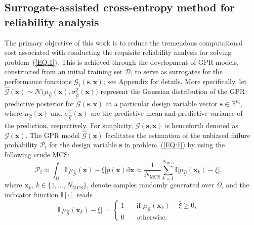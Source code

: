 \documentclass[preprint,3p]{elsarticle}
\begin{document}
\begin{linenumbers}
\subsection{Surrogate-assisted cross-entropy method for reliability analysis}\label{SUBSEC:23}
The primary objective of this work is to reduce the tremendous computational cost associated with conducting the requisite reliability analysis for solving problem~(\ref{EQ:1}).
This is achieved through the development of GPR models, constructed from an initial training set $\mathcal{D}$, to serve as surrogates for the performance functions $\mathcal{G}_i\left(\textbf{s},\textbf{x}\right)$; see Appendix for details.
More specifically, let $\widehat{\mathcal{G}}(\textbf{x})\sim\mathcal{N}\bigl(\mu_{\widehat{\mathcal{G}}}(\textbf{x}),\sigma_{\widehat{\mathcal{G}}}^2(\textbf{x})\bigr)$ represent the Gaussian distribution of the GPR predictive posterior for $\mathcal{G}\left(\textbf{s},\textbf{x}\right)$ at a particular design variable vector $\textbf{s}\in\mathbb{R}^{n_\text{s}}$, where $\mu_{\widehat{\mathcal{G}}}(\textbf{x})$ and $\sigma_{\widehat{\mathcal{G}}}^2(\textbf{x})$ are the predictive mean and predictive variance of the prediction, respectively.
For simplicity, $\mathcal{G}\left(\textbf{s},\textbf{x}\right)$ is henceforth denoted as $\mathcal{G}\left(\textbf{x}\right)$.
The GPR model $\widehat{\mathcal{G}}(\textbf{x})$ facilitates the estimation of the unbiased failure probability $\mathcal{P}_{\text{f}}$ for the design variable $\textbf{s}$ in problem~(\ref{EQ:1}) by using the following crude MCS:
\begin{equation}
    \mathcal{P}_\text{f} \approx \int_\Omega \mathbb{I}\bigr[\mu_{\widehat{\mathcal{G}}}(\textbf{x}) - \bar\xi\bigl]p(\textbf{x})\mathrm{d}\textbf{x} \approx \frac{1}{N_\text{MCS}}\displaystyle\sum_{k=1}^{N_\text{MCS}} \mathbb{I}\bigr[\mu_{\widehat{\mathcal{G}}}(\textbf{x}_k) - \bar\xi\bigl],
\label{EQ:9}
\end{equation}
where $\textbf {x}_k$, $k\in\{1,\dots,N_\mathrm{MCS}\}$, denote samples randomly generated over $\Omega$, and the indicator function 
$\mathbb{I}[\cdot]$ reads
\begin{equation}
    \mathbb{I}\bigr[\mu_{\widehat{\mathcal{G}}}(\textbf{x}_k) - \bar\xi\bigl] =
    \begin{cases}
        1  & \quad \text{if } \mu_{\widehat{\mathcal{G}}}(\textbf{x}_k) - \bar\xi \geq 0,\\
        0  & \quad \text{otherwise}.
    \end{cases}
\label{EQ:10}
\end{equation}


\end{linenumbers}
\end{document}
